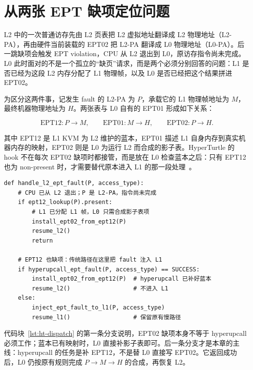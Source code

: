 \section{从两张 EPT 缺项定位问题}\label{sec:ht-motiv}

L2 中的一次普通访存先由 L2 页表把 L2 虚拟地址翻译成 L2 物理地址（L2-PA），再由硬件当前装载的 EPT02 把 L2-PA 翻译成 L0 物理地址（L0-PA）。后一跳缺项会触发 EPT violation，CPU 从 L2 退出到 L0，原访存指令尚未完成。L0 此时面对的不是一个孤立的“缺页”请求，而是两个必须分别回答的问题：L1 是否已经为这段 L2 内存分配了 L1 物理帧，以及 L0 是否已经把这个结果拼进 EPT02。

为区分这两件事，记发生 fault 的 L2-PA 为 $P$，承载它的 L1 物理帧地址为 $M$，最终机器物理地址为 $H$。两张表与 L0 自有的 EPT01 形成如下关系：

\begin{equation}
\mathrm{EPT12}:P\rightarrow M,\qquad
\mathrm{EPT01}:M\rightarrow H,\qquad
\mathrm{EPT02}:P\rightarrow H.
\end{equation}

其中 EPT12 是 L1 KVM 为 L2 维护的蓝本，EPT01 描述 L1 自身内存到真实机器内存的映射，EPT02 则是 L0 为运行 L2 而合成的影子表。HyperTurtle 的 hook 不在每次 EPT02 缺项时都接管，而是放在 L0 检查蓝本之后：只有 EPT12 也为 non-present 时，才需要替代原本进入 L1 的那一段处理~\cite{source8}。

\begin{lstlisting}[style=pseudopy,caption={L0 对一次 L2 EPT fault 的缺项分流（逻辑伪代码）},label={lst:ht-dispatch}]
def handle_l2_ept_fault(P, access_type):
    # CPU 已从 L2 退出；P 是 L2-PA，指令尚未完成
    if ept12_lookup(P).present:
        # L1 已分配 L1 帧，L0 只需合成影子表项
        install_ept02_from_ept12(P)
        resume_l2()
        return

    # EPT12 也缺项：传统路径在这里把 fault 注入 L1
    if hyperupcall_ept_fault(P, access_type) == SUCCESS:
        install_ept02_from_ept12(P)  # hyperupcall 已补好蓝本
        resume_l2()                  # 不进入 L1
    else:
        inject_ept_fault_to_l1(P, access_type)
        resume_l1()                  # 保留原有慢路径
\end{lstlisting}

代码块~\ref{lst:ht-dispatch} 的第一条分支说明，EPT02 缺项本身不等于 hyperupcall 必须工作；蓝本已有映射时，L0 直接补影子表即可。后一条分支才是本章的主线：hyperupcall 的任务是补 EPT12，不是替 L0 直接写 EPT02。它返回成功后，L0 仍按原有规则完成 $P\rightarrow M\rightarrow H$ 的合成，再恢复 L2。

